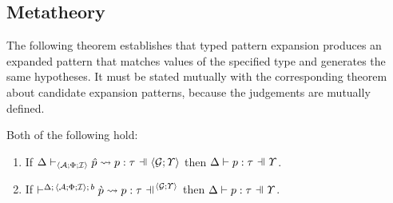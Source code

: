 \subsection{Metatheory}
The following theorem establishes that typed pattern expansion produces an expanded pattern that matches values of the specified type and generates the same hypotheses. It must be stated mutually with the corresponding theorem about candidate expansion patterns, because the judgements are mutually defined.
\begin{theorem}\label{thm:typed-pattern-expansion-B} Both of the following hold:
\begin{enumerate}
  \item If $\patExpands{\uGG{\uG}{\pctx}}{\uASI{\uA}{\Phi}{\uI}}{\upv}{p}{\tau}$ then $\patType{\pctx}{p}{\tau}$.
  \item If $\cvalidP{\uGG{\uG}{\pctx}}{\pscene{\Delta}{\uASI{\uA}{\Phi}{\uI}}{b}}{\cpv}{p}{\tau}$ then $\patType{\pctx}{p}{\tau}$.
\end{enumerate}
\end{theorem}
